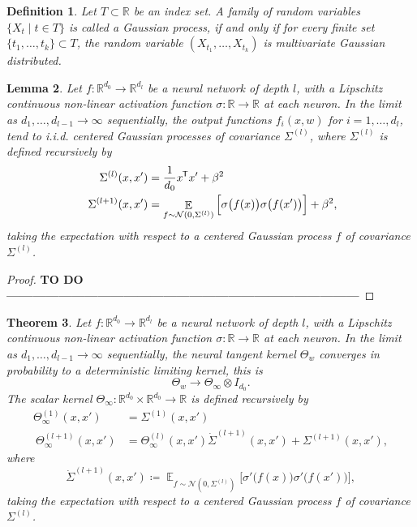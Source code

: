 \documentclass[11pt, a4paper]{article}
\newtheorem{theorem}{Theorem}[section]
\newtheorem{lemma}[theorem]{Lemma}
\newtheorem{definition}[theorem]{Definition}
\newcommand{\R}{\mathbb{R}}
\newcommand*{\tr}{^{\mkern-1.5mu\mathsf{T}}}
\DeclareMathOperator*{\E}{\mathbb{E}}
\begin{document}
\begin{definition}
Let $T \subset \R$ be an index set. A family of random variables $\{ X_t \mid t \in T \}$ is called a Gaussian process, if and only if for every finite set $\{ t_1, \dots, t_k \} \subset T$, the random variable $(X_{t_1}, \dots, X_{t_k})$ is multivariate Gaussian distributed.
\end{definition}

\begin{lemma}
Let $f: \R^{d_0} \to \R^{d_l}$ be a neural network of depth $l$, with a Lipschitz continuous non-linear activation function $\sigma: \R \to \R$ at each neuron. In the limit as $d_1, \dots, d_{l-1} \to \infty$ sequentially, the output functions $f_i(x,w)$ for $i=1, \dots, d_l$, tend to i.i.d. centered Gaussian processes of covariance $\Sigma^{(l)}$, where $\Sigma^{(l)}$ is defined recursively by
\[ \begin{split}
\Sigma^{(l)}(x,x') &= \frac{1}{d_0} x\tr x' + \beta^2 \\\
\Sigma^{(l+1)}(x,x') &= \E_{f \sim \mathcal{N}(0, \Sigma^{(l)})} \Big [ \sigma \big ( f(x) \big ) \sigma \big ( f(x') \big) \Big ] + \beta^2,
\end{split} \]
taking the expectation with respect to a centered Gaussian process $f$ of covariance $\Sigma^{(l)}$.
\end{lemma}

\begin{proof}
\textbf{TO DO ---------------------------------------------------------------------------------}
\end{proof}

\begin{theorem}
Let $f: \R^{d_0} \to \R^{d_l}$ be a neural network of depth $l$, with a Lipschitz continuous non-linear activation function $\sigma: \R \to \R$ at each neuron. In the limit as $d_1, \dots, d_{l-1} \to \infty$ sequentially, the neural tangent kernel $\Theta_w$ converges in probability to a deterministic limiting kernel, this is
\[ \Theta_w \to \Theta_{\infty} \otimes I_{d_0}. \]
The scalar kernel $\Theta_{\infty} : \R^{d_0} \times \R^{d_0} \to \R$ is defined recursively by
\[ \begin{split} 
\Theta_{\infty}^{(1)} (x,x') &= \Sigma^{(1)}(x,x') \\\
\Theta_{\infty}^{(l+1)}(x,x') &= \Theta_{\infty}^{(l)}(x,x') \dot{\Sigma}^{(l+1)}(x,x') + \Sigma^{(l+1)}(x,x'),
\end{split} \]
where 
\[ \dot{\Sigma}^{(l+1)}(x,x') \coloneq \E_{f \sim \mathcal{N}(0, \Sigma^{(l)})} \Big [ \sigma' \big ( f(x) \big ) \sigma' \big ( f(x') \big) \Big ], \]
taking the expectation with respect to a centered Gaussian process $f$ of covariance $\Sigma^{(l)}$.
\end{theorem}
\end{document}
